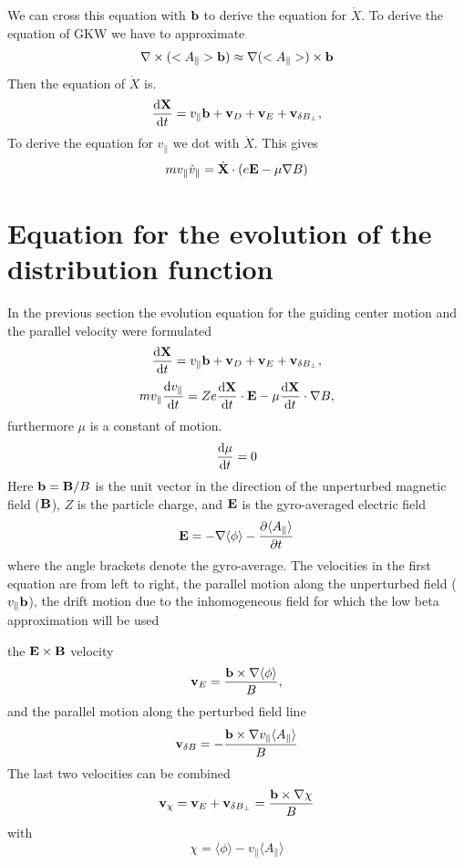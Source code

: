 \documentclass{report}
\def\be{\begin{equation}}
\def\ee{\end{equation}}
\begin{document}
We can cross this equation with ${\bf b}$ to derive the equation for $\dot X$. To derive the equation of GKW we have
to approximate
\be
\nabla \times (<A_{\parallel}>{\bf b})\approx \nabla  (<A_{\parallel}>)\times {\bf b}
\ee
Then the equation of $\dot X$ is.
\be 
{{\rm d} {\bf X} \over {\rm d} t} = v_\parallel {\bf b} + {\bf v}_D + {\bf v}_E + {\bf v}_{\delta B_\perp}, 
\ee
To derive the equation for $v_{\parallel}$ we dot with $\dot X$. This gives
\be
mv_{\parallel}{\dot v}_{\parallel}={\dot {\bf X}}\cdot \left(e{\bf E}-\mu \nabla B\right)
\ee


\section{Equation for the evolution of the distribution function} 

In the previous section the evolution equation for the guiding center motion and the parallel velocity 
were formulated 
\be 
{{\rm d} {\bf X} \over {\rm d} t} = v_\parallel {\bf b} + {\bf v}_D + {\bf v}_E + {\bf v}_{\delta B_\perp}, 
\ee
\be 
m v_\parallel {{\rm d} v_\parallel \over {\rm d} t} =  Z {e } 
{{\rm d} {\bf X} \over {\rm d} t} \cdot  {\bf E}  - \mu 
{{\rm d} {\bf X} \over {\rm d} t}\cdot \nabla B,
\ee
furthermore $\mu$ is a constant of motion. 
\be 
{{\rm d} \mu \over {\rm d} t} = 0
\ee
Here ${\bf b} = {\bf B}/B$ is the unit vector in the direction of the unperturbed magnetic field 
(${\bf B}$), $Z$ is the particle charge, and $\bf E$ is the gyro-averaged electric field 
\be 
{\bf E} = -\nabla \langle \phi \rangle  - {\partial \langle A_\parallel \rangle \over \partial t} 
\ee
where the angle brackets denote the gyro-average. 
The velocities in the first equation are from left to right, the parallel motion along the 
unperturbed field ($v_\parallel {\bf b}$), the drift motion due to the inhomogeneous field 
for which the low beta approximation will be used 

the ${\bf E} \times {\bf B}$ velocity 
\be 
{\bf v}_E = {{\bf b} \times \nabla \langle \phi \rangle \over B},
\ee   
and the parallel motion along the perturbed field line 
\be 
{\bf v}_{\delta B} = - {{\bf b} \times \nabla v_\parallel \langle A_\parallel \rangle \over B} 
\ee 
The last two velocities can be combined 
\be 
\label{electromag}
\index{electromagnetic perturbations}
{\bf v}_\chi = {\bf v}_E + {\bf v}_{\delta B_\perp} = {{\bf b} \times \nabla \chi \over B} 
\ee
with 
\be 
\chi = \langle \phi \rangle - v_\parallel \langle A_\parallel \rangle 
\ee
\end{document}
